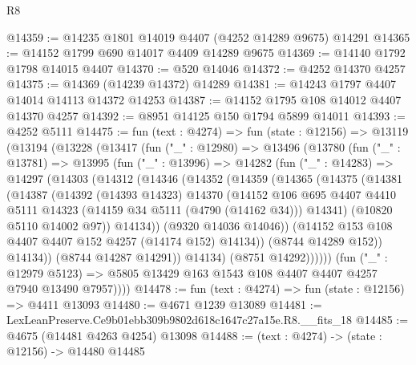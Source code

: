 \begin{lexlean}{R8}
\begin{coremodule}
@14359 := @14235 @1801 @14019 @4407 (@4252 @14289 @9675) @14291
@14365 := @14152 @1799 @690 @14017 @4409 @14289 @9675
@14369 := @14140 @1792 @1798 @14015 @4407
@14370 := @520 @14046
@14372 := @4252 @14370 @4257
@14375 := @14369 (@14239 @14372) @14289
@14381 := @14243 @1797 @4407 @14014 @14113 @14372 @14253
@14387 := @14152 @1795 @108 @14012 @4407 @14370 @4257
@14392 := @8951 @14125 @150 @1794 @5899 @14011
@14393 := @4252 @5111
@14475 := fun (text : @4274) =>
  fun (state : @12156) =>
  @13119
    (@13194
      (@13228
        (@13417
          (fun ("_" : @12980) =>
          @13496
            (@13780
              (fun ("_" : @13781) =>
              @13995
                (fun ("_" : @13996) =>
                @14282
                  (fun ("_" : @14283) =>
                  @14297
                    (@14303
                      (@14312
                        (@14346
                          (@14352
                            (@14359
                              (@14365
                                (@14375
                                  (@14381
                                    (@14387
                                      (@14392
                                        (@14393 @14323)
                                        @14370
                                        (@14152
                                          @106
                                          @695
                                          @4407
                                          @4410
                                          @5111
                                          @14323
                                          (@14159 @34 @5111 (@4790 (@14162 @34)))
                                          @14341)
                                        (@10820 @5110 @14002 @97))
                                      @14134))
                                  (@9320 @14036 @14046))
                                (@14152 @153 @108 @4407 @4407 @152 @4257 (@14174 @152) @14134))
                              (@8744 @14289 @152))
                            @14134))
                        (@8744 @14287 @14291))
                      @14134)
                    (@8751 @14292))))))
          (fun ("_" : @12979 @5123) =>
          @5805 @13429 @163 @1543 @108 @4407 @4407 @4257 @7940 @13490 @7957))))
@14478 := fun (text : @4274) => fun (state : @12156) => @4411 @13093
@14480 := @4671 @1239 @13089
@14481 := LexLeanPreserve.Ce9b01ebb309b9802d618c1647c27a15e.R8.__fits_18
@14485 := @4675 (@14481 @4263 @4254) @13098
@14488 := (text : @4274) -> (state : @12156) -> @14480 @14485

\end{coremodule}
\end{lexlean}
